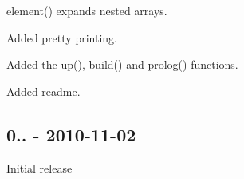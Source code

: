 \begin{DoxyItemize}
\item {\ttfamily element()} expands nested arrays.
\item Added pretty printing.
\item Added the {\ttfamily up()}, {\ttfamily build()} and {\ttfamily prolog()} functions.
\item Added readme.
\end{DoxyItemize}

\subsection*{0.. -\/ 2010-\/11-\/02}


\begin{DoxyItemize}
\item Initial release 
\end{DoxyItemize}
